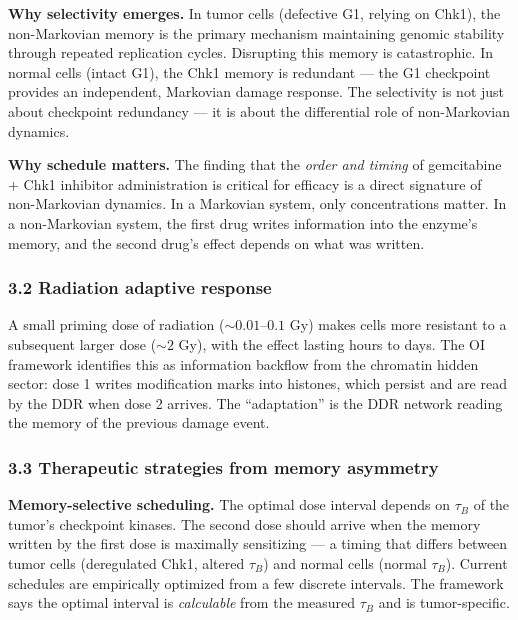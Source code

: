 \documentclass[
  11pt,
]{article}
\begin{document}
\textbf{Why selectivity emerges.} In tumor cells (defective G1, relying
on Chk1), the non-Markovian memory is the primary mechanism maintaining
genomic stability through repeated replication cycles. Disrupting this
memory is catastrophic. In normal cells (intact G1), the Chk1 memory is
redundant --- the G1 checkpoint provides an independent, Markovian
damage response. The selectivity is not just about checkpoint redundancy
--- it is about the differential role of non-Markovian dynamics.

\textbf{Why schedule matters.} The finding that the \emph{order and
timing} of gemcitabine + Chk1 inhibitor administration is critical for
efficacy is a direct signature of non-Markovian dynamics. In a Markovian
system, only concentrations matter. In a non-Markovian system, the first
drug writes information into the enzyme's memory, and the second drug's
effect depends on what was written.

\hypertarget{radiation-adaptive-response}{%
\subsubsection{3.2 Radiation adaptive
response}\label{radiation-adaptive-response}}

A small priming dose of radiation (\(\sim 0.01\)--\(0.1\) Gy) makes
cells more resistant to a subsequent larger dose (\(\sim 2\) Gy), with
the effect lasting hours to days. The OI framework identifies this as
information backflow from the chromatin hidden sector: dose 1 writes
modification marks into histones, which persist and are read by the DDR
when dose 2 arrives. The ``adaptation'' is the DDR network reading the
memory of the previous damage event.

\hypertarget{therapeutic-strategies-from-memory-asymmetry}{%
\subsubsection{3.3 Therapeutic strategies from memory
asymmetry}\label{therapeutic-strategies-from-memory-asymmetry}}

\textbf{Memory-selective scheduling.} The optimal dose interval depends
on \(\tau_B\) of the tumor's checkpoint kinases. The second dose should
arrive when the memory written by the first dose is maximally
sensitizing --- a timing that differs between tumor cells (deregulated
Chk1, altered \(\tau_B\)) and normal cells (normal \(\tau_B\)). Current
schedules are empirically optimized from a few discrete intervals. The
framework says the optimal interval is \emph{calculable} from the
measured \(\tau_B\) and is tumor-specific.
\end{document}
